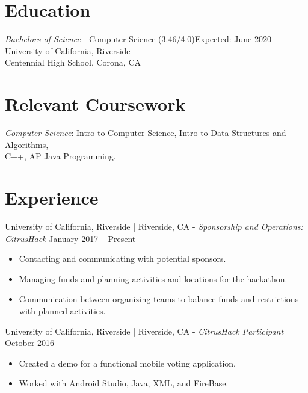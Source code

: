 \documentclass[letter]{res}
\begin{document}
\address{ (951) 318-2818\\ 
  \texttt{sshar032@ucr.edu}\\}
\address{
  \texttt{856 Pheasant St }\\ 
  \texttt{Corona, California, 92881 }\\} 
\begin{resume}
  \noindent\makebox[\linewidth]{\rule{\paperwidth}{.05pt}}

\section{Education}
{\sl Bachelors of Science} - Computer Science (3.46/4.0)\hfill Expected: June 2020\\
University of California, Riverside \\
Centennial High School, Corona, CA
  \vspace{-2mm}
\section{Relevant Coursework}
  {\sl Computer Science}: Intro to Computer Science, Intro to Data Structures and Algorithms, \\
  C++, AP Java Programming.\\

\section{Experience}
University of California, Riverside | Riverside, CA \newline
 - {\sl Sponsorship and Operations: CitrusHack} \hfill January 2017 – Present\\
 \vspace{-2mm}
 \begin{itemize}
 \item Contacting and communicating with potential sponsors.
 \item Managing funds and planning activities and locations for the hackathon.
 \item Communication between organizing teams to balance funds and restrictions with planned activities.
 \end{itemize}
   \vspace{-2mm}

University of California, Riverside | Riverside, CA \newline - {\sl CitrusHack Participant} \hfill October 2016\\
  \vspace{-2mm}
  \begin{itemize}
  \item Created a demo for a functional mobile voting application.
  \item Worked with Android Studio, Java, XML, and FireBase.
  \end{itemize}
    \vspace{-2mm}


\end{resume}
\end{document}
